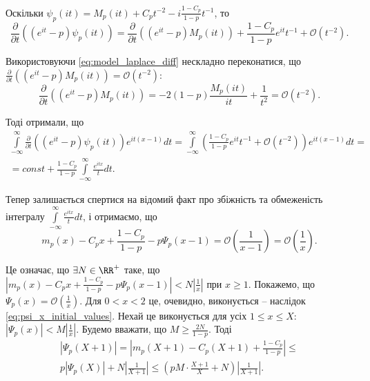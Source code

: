 Оскільки $\psi_{p}(it)=M_{p}(it) + C_{p} t^{-2} - i \frac{1-C_{p}}{1 - p} t^{-1}$, то
\begin{equation*}
\frac{\partial}{\partial t}((e^{it} - p) \psi_{p}(it)) = \frac{\partial}{\partial t}((e^{it} - p) M_{p}(it)) + \frac{1-C_{p}}{1 - p} e^{it} t^{-1} + \mathcal{O}(t^{-2}).
\end{equation*}

Використовуючи \eqref{eq:model_laplace_diff} нескладно переконатися, що $\frac{\partial}{\partial t}((e^{it} - p) M_{p}(it)) = \mathcal{O}(t^{-2})$:
\begin{equation*}
\frac{\partial}{\partial t}((e^{it} - p) M_{p}(it)) = -2(1-p) \frac{M_{p}(it)}{it} + \frac{1}{t^2} = \mathcal{O}(t^{-2}).
\end{equation*}

Тоді отримали, що
\begin{gather*}
\int\limits_{-\infty}^{\infty} \frac{\partial}{\partial t}((e^{it} - p) \psi_{p}(it)) e^{it(x-1)} dt = \int\limits_{-\infty}^{\infty} \left(\frac{1-C_{p}}{1 - p} e^{it} t^{-1} + \mathcal{O}(t^{-2}) \right) e^{it(x-1)} dt = \\
= const + \frac{1-C_{p}}{1 - p} \int\limits_{-\infty}^{\infty} \frac{e^{itx}}{t} dt.
\end{gather*}

Тепер залишається спертися на відомий факт про збіжність та обмеженість інтегралу $\int\limits_{-\infty}^{\infty} \frac{e^{itx}}{t} dt$, і отримаємо, що 
\begin{equation*}
m_{p}(x) - C_{p} x + \frac{1 - C_p}{1-p} - p\Psi_{p}(x-1) = \mathcal{O}\left(\frac{1}{x-1}\right) = \mathcal{O}\left(\frac{1}{x}\right).
\end{equation*}

Це означає, що $\exists N \in \RR^{+}$ таке, що $|m_{p}(x) - C_{p} x + \frac{1 - C_p}{1-p} - p\Psi_{p}(x-1)| < N \left|\frac{1}{x}\right|$ при $x \geq 1$. Покажемо, що $\Psi_{p}(x) = \mathcal{O}(\frac{1}{x})$. Для $0<x<2$ це, очевидно, виконується -- наслідок \eqref{eq:psi_x_initial_values}. Нехай це виконується для усіх $1 \leq x \leq X$: $|\Psi_{p}(x)| < M\left|\frac{1}{x}\right|$. Будемо вважати, що $M \geq \frac{2N}{1 - p}$. Тоді
\begin{gather*}
|\Psi_{p}(X + 1)| = |m_{p}(X+1) - C_{p} (X+1) + \frac{1 - C_p}{1-p}| \leq \\
 p|\Psi_{p}(X)| + N \left|\frac{1}{X+1}\right| \leq (p M \cdot \frac{X+1}{X} + N) \left|\frac{1}{X+1}\right|.
\end{gather*}

